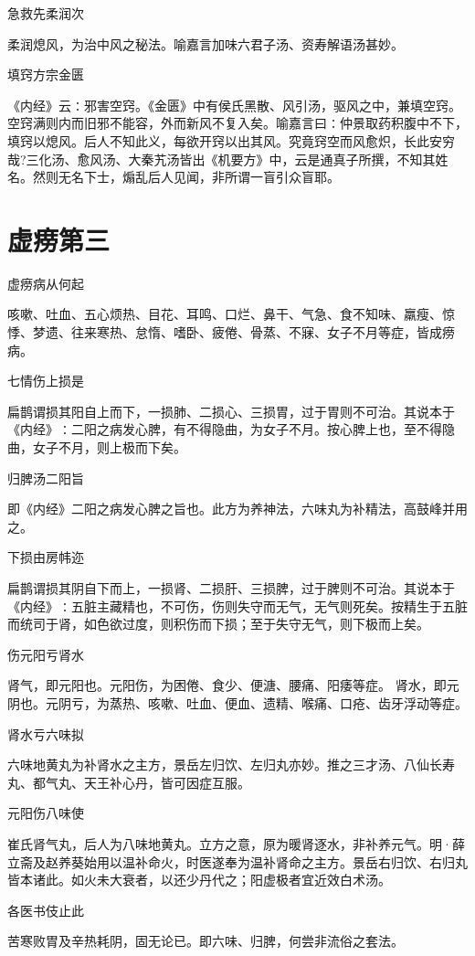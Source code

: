 \documentclass[a4paper,12pt,UTF8,twoside]{ctexbook}
\begin{document}
	急救先柔润次
	
	柔润熄风，为治中风之秘法。喻嘉言加味六君子汤、资寿解语汤甚妙。
	
	填窍方宗金匮
	
	《内经》云∶邪害空窍。《金匮》中有侯氏黑散、风引汤，驱风之中，兼填空窍。空窍满则内而旧邪不能容，外而新风不复入矣。喻嘉言曰∶仲景取药积腹中不下，填窍以熄风。后人不知此义，每欲开窍以出其风。究竟窍空而风愈炽，长此安穷哉?三化汤、愈风汤、大秦艽汤皆出《机要方》中，云是通真子所撰，不知其姓名。然则无名下士，煽乱后人见闻，非所谓一盲引众盲耶。
	
	\chapter{虚痨第三}
	虚痨病从何起
	
	咳嗽、吐血、五心烦热、目花、耳鸣、口烂、鼻干、气急、食不知味、羸瘦、惊悸、梦遗、往来寒热、怠惰、嗜卧、疲倦、骨蒸、不寐、女子不月等症，皆成痨病。
	
	七情伤上损是
	
	扁鹊谓损其阳自上而下，一损肺、二损心、三损胃，过于胃则不可治。其说本于《内经》∶二阳之病发心脾，有不得隐曲，为女子不月。按心脾上也，至不得隐曲，女子不月，则上极而下矣。
	
	归脾汤二阳旨
	
	即《内经》二阳之病发心脾之旨也。此方为养神法，六味丸为补精法，高鼓峰并用之。
	
	下损由房帏迩
	
	扁鹊谓损其阴自下而上，一损肾、二损肝、三损脾，过于脾则不可治。其说本于《内经》∶五脏主藏精也，不可伤，伤则失守而无气，无气则死矣。按精生于五脏而统司于肾，如色欲过度，则积伤而下损；至于失守无气，则下极而上矣。
	
	伤元阳亏肾水
	
	肾气，即元阳也。元阳伤，为困倦、食少、便溏、腰痛、阳痿等症。
	肾水，即元阴也。元阴亏，为蒸热、咳嗽、吐血、便血、遗精、喉痛、口疮、齿牙浮动等症。
	
	肾水亏六味拟
	
	六味地黄丸为补肾水之主方，景岳左归饮、左归丸亦妙。推之三才汤、八仙长寿丸、都气丸、天王补心丹，皆可因症互服。
	
	元阳伤八味使
	
	崔氏肾气丸，后人为八味地黄丸。立方之意，原为暖肾逐水，非补养元气。明·薛立斋及赵养葵始用以温补命火，时医遂奉为温补肾命之主方。景岳右归饮、右归丸皆本诸此。如火未大衰者，以还少丹代之；阳虚极者宜近效白术汤。
	
	各医书伎止此
	
	苦寒败胃及辛热耗阴，固无论已。即六味、归脾，何尝非流俗之套法。
	
\end{document}
